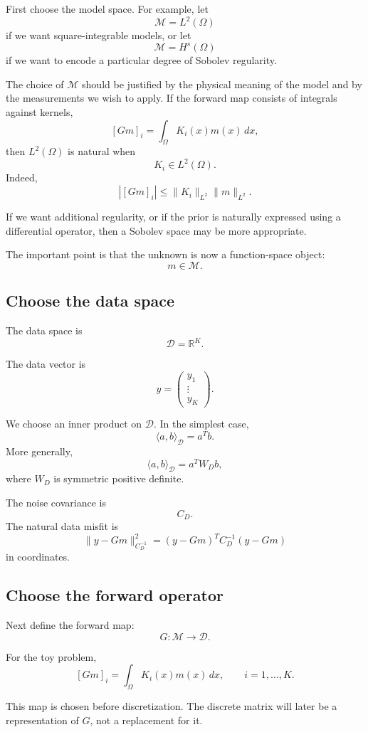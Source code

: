 \documentclass[11pt,a4paper]{book}
\newcommand{\M}{\mathcal{M}}      %
\newcommand{\D}{\mathcal{D}}      %
\newcommand{\R}{\mathbb{R}}
\newcommand{\obs}{y}
\newcommand{\G}{G}
\begin{document}
First choose the model space. For example, let
\[
    \M=L^2(\Omega)
\]
if we want square-integrable models, or let
\[
    \M=H^s(\Omega)
\]
if we want to encode a particular degree of Sobolev regularity.

The choice of $\M$ should be justified by the physical meaning of the model and
by the measurements we wish to apply. If the forward map consists of integrals
against kernels,
\[
    [\G m]_i
    =
    \int_\Omega K_i(x)m(x)\,dx,
\]
then $L^2(\Omega)$ is natural when
\[
    K_i\in L^2(\Omega).
\]
Indeed,
\[
    |[\G m]_i|
    \leq
    \|K_i\|_{L^2}\|m\|_{L^2}.
\]

If we want additional regularity, or if the prior is naturally expressed using
a differential operator, then a Sobolev space may be more appropriate.

The important point is that the unknown is now a function-space object:
\[
    m\in\M.
\]

\subsection{Choose the data space}

The data space is
\[
    \D=\R^K.
\]

The data vector is
\[
    \obs =
    \begin{pmatrix}
        y_1\\
        \vdots\\
        y_K
    \end{pmatrix}.
\]

We choose an inner product on $\D$. In the simplest case,
\[
    \langle a,b\rangle_{\D}=a^Tb.
\]
More generally,
\[
    \langle a,b\rangle_{\D}=a^TW_Db,
\]
where $W_D$ is symmetric positive definite.

The noise covariance is
\[
    C_D.
\]
The natural data misfit is
\[
    \|\obs-\G m\|_{C_D^{-1}}^2
    =
    (\obs-\G m)^T C_D^{-1}(\obs-\G m)
\]
in coordinates.

\subsection{Choose the forward operator}

Next define the forward map:
\[
    \G:\M\to\D.
\]

For the toy problem,
\[
    [\G m]_i
    =
    \int_\Omega K_i(x)m(x)\,dx,
    \qquad
    i=1,\ldots,K.
\]

This map is chosen before discretization. The discrete matrix will later be a
representation of $\G$, not a replacement for it.
\end{document}
